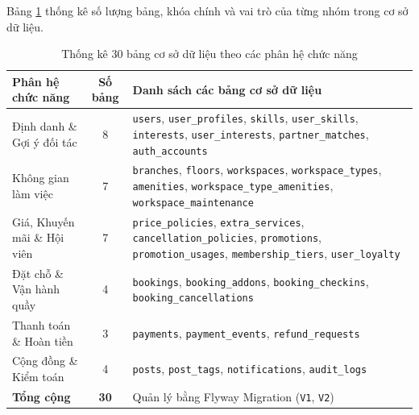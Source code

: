 
Bảng \ref{tab:bang_theo_module} thống kê số lượng bảng, khóa chính và vai trò của từng nhóm trong cơ sở dữ liệu.

\begin{table}[H]
\centering
\caption{Thống kê 30 bảng cơ sở dữ liệu theo các phân hệ chức năng}
\label{tab:bang_theo_module}
\small
\renewcommand{\arraystretch}{1.2}
\begin{tabular}{|p{3.8cm}|c|p{8.4cm}|}
\hline
\textbf{Phân hệ chức năng} & \textbf{Số bảng} & \textbf{Danh sách các bảng cơ sở dữ liệu} \\
\hline
Định danh \& Gợi ý đối tác & 8 & \texttt{users}, \texttt{user\_profiles}, \texttt{skills}, \texttt{user\_skills}, \texttt{interests}, \texttt{user\_interests}, \texttt{partner\_matches}, \texttt{auth\_accounts} \\
\hline
Không gian làm việc & 7 & \texttt{branches}, \texttt{floors}, \texttt{workspaces}, \texttt{workspace\_types}, \texttt{amenities}, \texttt{workspace\_type\_amenities}, \texttt{workspace\_maintenance} \\
\hline
Giá, Khuyến mãi \& Hội viên & 7 & \texttt{price\_policies}, \texttt{extra\_services}, \texttt{cancellation\_policies}, \texttt{promotions}, \texttt{promotion\_usages}, \texttt{membership\_tiers}, \texttt{user\_loyalty} \\
\hline
Đặt chỗ \& Vận hành quầy & 4 & \texttt{bookings}, \texttt{booking\_addons}, \texttt{booking\_checkins}, \texttt{booking\_cancellations} \\
\hline
Thanh toán \& Hoàn tiền & 3 & \texttt{payments}, \texttt{payment\_events}, \texttt{refund\_requests} \\
\hline
Cộng đồng \& Kiểm toán & 4 & \texttt{posts}, \texttt{post\_tags}, \texttt{notifications}, \texttt{audit\_logs} \\
\hline
\textbf{Tổng cộng} & \textbf{30} & Quản lý bằng Flyway Migration (\texttt{V1}, \texttt{V2}) \\
\hline
\end{tabular}
\end{table}

